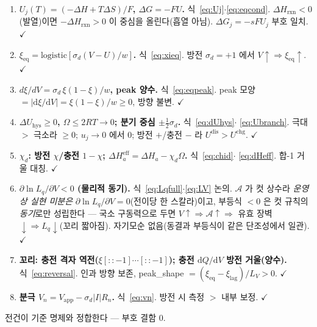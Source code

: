 \documentclass[11pt,a4paper]{article}
\newcommand{\dd}{\mathrm{d}}
\newcommand{\eff}{\mathrm{eff}}
\newcommand{\eq}{\mathrm{eq}}
\newcommand{\app}{\mathrm{app}}
\newcommand{\rxn}{\mathrm{rxn}}
\newcommand{\dis}{\mathrm{dis}}
\newcommand{\chg}{\mathrm{chg}}
\newcommand{\hys}{\mathrm{hys}}
\begin{document}
\begin{enumerate}[label=\textbf{S\arabic*.},leftmargin=2.6em,itemsep=2pt]
\item \textbf{$U_j(T)=(-\Delta H+T\Delta S)/F$, $\Delta G=-FU$.} 식~\eqref{eq:Uj}$\cdot$\eqref{eq:eqcond}. $\Delta H_\rxn<0$
(발열)이면 $-\Delta H_\rxn>0$ 이 중심을 올린다(흡열 아님). $\Delta G_j=-sFU_j$ 부호 일치. $\checkmark$
\item \textbf{$\xi_\eq=\mathrm{logistic}[\sigma_d(V-U)/w]$.} 식~\eqref{eq:xieq}. 방전 $\sigma_d=+1$ 에서
$V\!\uparrow\Rightarrow\xi_\eq\!\uparrow$. $\checkmark$
\item \textbf{$d\xi/dV=\sigma_d\,\xi(1-\xi)/w$, peak 양수.} 식~\eqref{eq:eqpeak}. peak 모양 $=|\dd\xi/\dd V|=
\xi(1-\xi)/w\ge0$, 방향 불변. $\checkmark$
\item \textbf{$\Delta U_\hys\ge0$, $\Omega\le2RT\to0$; 분기 중심 $\pm\tfrac12\sigma_d$.} 식~\eqref{eq:dUhys}$\cdot$
\eqref{eq:Ubranch}. 극대 $>$ 극소라 $\ge0$; $u_j\to0$ 에서 $0$; 방전 $+$/충전 $-$ 라 $U^{\dis}>U^{\chg}$. $\checkmark$
\item \textbf{$\chi_d$: 방전 $\chi$/충전 $1-\chi$; $\Delta H_a^\eff=\Delta H_a-\chi_d\Omega$.} 식~\eqref{eq:chid}$\cdot$
\eqref{eq:dHeff}. 합-1 거울 대칭. $\checkmark$
\item \textbf{$\partial\ln L_q/\partial V<0$ (물리적 동기).} 식~\eqref{eq:Lqfull}$\cdot$\eqref{eq:LV} 논의. $\mathcal A$ 가
컷 상수라 \emph{운영상 실현 미분은} $\partial\ln L_q/\partial V=0$(전이당 한 스칼라)이고, 부등식 $<0$ 은 컷 규칙의
\emph{동기}로만 성립한다 --- 국소 구동력으로 두면 $V\!\uparrow\Rightarrow\mathcal A\!\uparrow\Rightarrow$ 유효 장벽
$\downarrow\Rightarrow L_q\downarrow$(꼬리 짧아짐). 자기모순 없음(동결과 부등식이 같은 단조성에서 일관). $\checkmark$
\item \textbf{꼬리: 충전 격자 역전($\xi[::-1]\cdots[::-1]$); 충전 $\dd Q/\dd V$ 방전 거울(양수).} 식~\eqref{eq:reversal}.
인과 방향 보존, peak\_shape $=(\xi_\eq-\xi_\mathrm{lag})/L_V>0$. $\checkmark$
\item \textbf{분극 $V_n=V_\app-\sigma_d|I|R_n$.} 식~\eqref{eq:vn}. 방전 시 측정 $>$ 내부 보정. $\checkmark$
\end{enumerate}
전건이 기준 명제와 정합한다 --- 부호 결함 $0$.
\end{document}
